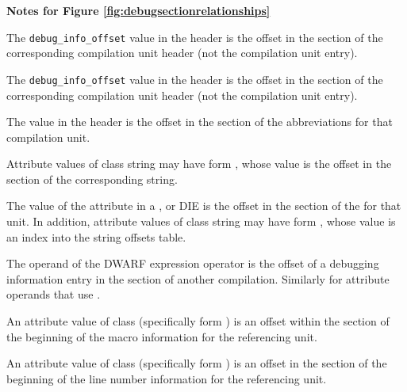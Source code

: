 \clearpage
\begin{center}
   \textbf{Notes for Figure \ref{fig:debugsectionrelationships}}
\end{center}
\begin{description} 
The \texttt{debug\_info\_offset} value in
the header is
the offset in the \dotdebuginfo{} section of the
corresponding compilation unit header (not the compilation
unit entry).

The \texttt{debug\_info\_offset} value in the header is the offset in the
\dotdebuginfo{} section of the 
corresponding compilation unit header (not
the compilation unit entry). 

The \HFNdebugabbrevoffset{} value in the header is the offset in the
\dotdebugabbrev{} 
section of the abbreviations for that compilation unit.

Attribute values of class string may have form 
\DWFORMstrp, whose
value is the offset in the \dotdebugstr{}
section of the corresponding string.

The value of the \DWATstroffsetsbase{} attribute in a
\DWTAGcompileunit{}, \DWTAGtypeunit{} or \DWTAGpartialunit{} 
DIE is the offset in the
\dotdebugstroffsets{} section of the 
for that unit.
In addition, attribute values of class string may have form 
\DWFORMstrx, whose value is an index into the
string offsets table.

The operand of the \DWOPcallref{} 
DWARF expression operator is the
offset of a debugging information entry in the 
\dotdebuginfo{} section of another compilation.
Similarly for attribute operands that use
\DWFORMrefaddr.

An attribute value of class 
 (specifically form
\DWFORMsecoffset) is an 
offset within the 
\dotdebugmacro{} section
of the beginning of the macro information for the referencing unit.

An attribute value of class 
 (specifically form
\DWFORMsecoffset) 
is an offset in the 
\dotdebugline{} section of the
beginning of the line number information for the referencing unit.


\end{description}
